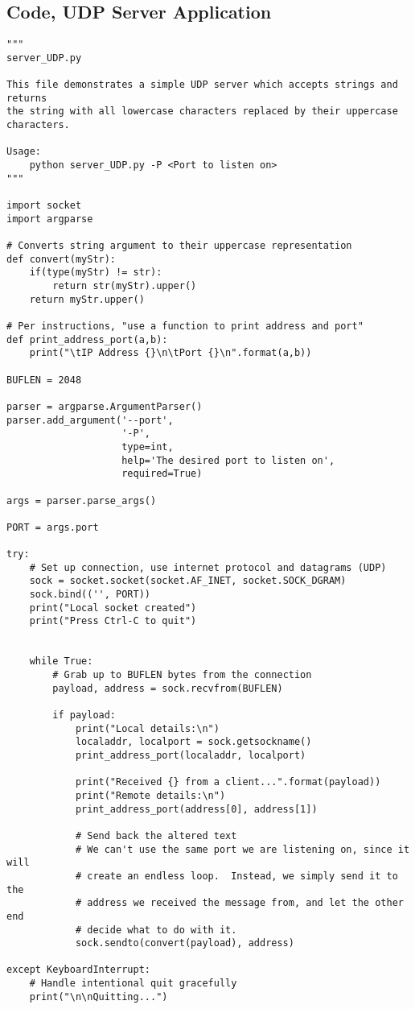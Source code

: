 \documentclass{article}
\begin{document}
\subsection*{Code, UDP Server Application}
\begin{verbatim}
"""
server_UDP.py

This file demonstrates a simple UDP server which accepts strings and returns
the string with all lowercase characters replaced by their uppercase
characters.

Usage:
    python server_UDP.py -P <Port to listen on>
"""

import socket
import argparse

# Converts string argument to their uppercase representation
def convert(myStr):
    if(type(myStr) != str):
        return str(myStr).upper()
    return myStr.upper()

# Per instructions, "use a function to print address and port"
def print_address_port(a,b):
    print("\tIP Address {}\n\tPort {}\n".format(a,b))

BUFLEN = 2048

parser = argparse.ArgumentParser()
parser.add_argument('--port',
                    '-P',
                    type=int,
                    help='The desired port to listen on',
                    required=True)

args = parser.parse_args()

PORT = args.port

try:
    # Set up connection, use internet protocol and datagrams (UDP)
    sock = socket.socket(socket.AF_INET, socket.SOCK_DGRAM)
    sock.bind(('', PORT))
    print("Local socket created")
    print("Press Ctrl-C to quit")


    while True:
        # Grab up to BUFLEN bytes from the connection
        payload, address = sock.recvfrom(BUFLEN)

        if payload:
            print("Local details:\n")
            localaddr, localport = sock.getsockname()
            print_address_port(localaddr, localport)

            print("Received {} from a client...".format(payload))
            print("Remote details:\n")
            print_address_port(address[0], address[1])

            # Send back the altered text
            # We can't use the same port we are listening on, since it will
            # create an endless loop.  Instead, we simply send it to the
            # address we received the message from, and let the other end
            # decide what to do with it.
            sock.sendto(convert(payload), address)

except KeyboardInterrupt:
    # Handle intentional quit gracefully
    print("\n\nQuitting...")
\end{verbatim}
\end{document}
